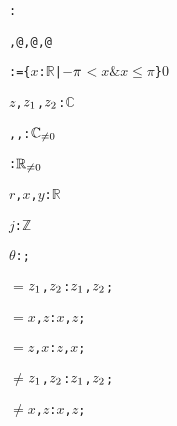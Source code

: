 \begin{alltt}
: 

   , @, @, @

  :  = \{\(x\): \(\mathbb{R}\) | \(\opdifferenceonefn{\pi}\) \(<\) \(x\) \(\&\) \(x\) \(\leq\) \(\pi\)\}  \(0\)\vspace*{\pvsdeclspacing}

  \(z\), \(z\sb{1}\), \(z\sb{2}\):  \(\mathbb{C}\)\vspace*{\pvsdeclspacing}

  , , :  \({\pvssubscript{\mathbb{C}}{{\not=}0}}\)\vspace*{\pvsdeclspacing}

  :  \({\pvssubscript{\mathbb{R}}{{\not=}0}}\)\vspace*{\pvsdeclspacing}

  \(r\), \(x\), \(y\):  \(\mathbb{R}\)\vspace*{\pvsdeclspacing}

  \(j\):  \(\mathbb{Z}\)\vspace*{\pvsdeclspacing}

  \(\theta\):  ;\vspace*{\pvsdeclspacing}

  \(=\)\pvsid{(}\(z\sb{1}\), \(z\sb{2}\)\pvsid{)}:   \pvskey{=} \pvsid{(}\(z\sb{1}\), \(z\sb{2}\)\pvsid{)};\vspace*{\pvsdeclspacing}

  \(=\)\pvsid{(}\(x\), \(z\)\pvsid{)}:   \pvskey{=} \pvsid{(}\(x\), \(z\)\pvsid{)};\vspace*{\pvsdeclspacing}

  \(=\)\pvsid{(}\(z\), \(x\)\pvsid{)}:   \pvskey{=} \pvsid{(}\(z\), \(x\)\pvsid{)};\vspace*{\pvsdeclspacing}

  \(\neq\)\pvsid{(}\(z\sb{1}\), \(z\sb{2}\)\pvsid{)}:   \pvskey{=} \pvsid{(}\(z\sb{1}\), \(z\sb{2}\)\pvsid{)};\vspace*{\pvsdeclspacing}

  \(\neq\)\pvsid{(}\(x\), \(z\)\pvsid{)}:   \pvskey{=} \pvsid{(}\(x\), \(z\)\pvsid{)};\vspace*{\pvsdeclspacing}


\end{alltt}
